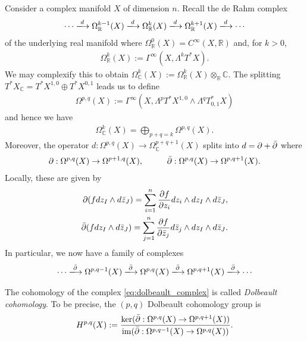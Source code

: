 \documentclass[12pt]{ociamthesis}  %
\begin{document}
Consider a complex manifold $X$ of dimension $n$. Recall the de Rahm
complex
\begin{align*}
  \cdots \xlongrightarrow{d}
  \Omega_{\mathbb{R}}^{k-1}(X)\xlongrightarrow{d}
  \Omega_{\mathbb{R}}^{k}(X)\xlongrightarrow{d}
  \Omega_{\mathbb{R}}^{k+1}(X)\xlongrightarrow{d}
  \cdots
\end{align*}
of the underlying real manifold where
$\Omega^0_{\mathbb{R}}(X) = C^\infty(X,\mathbb{R})$ and,
for $k > 0$,
\begin{align*}
  \Omega^k_{\mathbb{R}}(X) := \Gamma^\infty(X,\Lambda^k T^*X).
\end{align*}
We may complexify this to obtain
$\Omega^k_{\mathbb C}(X) := \Omega^k_{\mathbb R}(X)\otimes_{\mathbb{R}} \mathbb{C}$.
The splitting $T^*X_\mathbb{C} = T^*X^{1,0} \oplus T^*X^{0,1}$
leads us to define
\begin{align*}
  \Omega^{p,q}(X)
  := \Gamma^\infty(X,\Lambda^p T^*X^{1,0} \wedge\Lambda^q T^*_{0,1}X)
\end{align*}
and hence we have
\begin{align*}
  \Omega^k_{\mathbb C}(X) = \bigoplus_{p+q=k} \Omega^{p,q}(X).
\end{align*}
Moreover, the operator $d : \Omega^{p,q}(X) \to \Omega^{p+q+1}_{\mathbb C}(X)$
splits into $d = \partial + {\bar{\partial}}$ where
\begin{align*}
  \partial : \Omega^{p,q}(X) \to \Omega^{p+1,q}(X),\hspace{1cm}
  {\bar{\partial}} : \Omega^{p,q}(X) \to \Omega^{p,q+1}(X).
\end{align*}
Locally, these are given by
\begin{align*}
  \partial (f dz_I \wedge d\bar z_J) = \sum_{i=1}^n \frac{\partial f}{\partial z_i} dz_i\wedge dz_I \wedge d\bar z_J, \\
  {\bar{\partial}} (f dz_I \wedge d\bar z_J) = \sum_{j=1}^n \frac{\partial f}{\partial \bar z_j} d\bar z_j\wedge dz_I \wedge d\bar z_J.
\end{align*}
In particular, we now have a family of complexes
\begin{align}\label{eq:dolbeault_complex}
  \cdots \xlongrightarrow\dol
  \Omega^{p,q-1}(X)\xlongrightarrow\dol
  \Omega^{p,q}(X)\xlongrightarrow\dol
  \Omega^{p,q+1}(X)\xlongrightarrow\dol
  \cdots
\end{align}
\begin{definition}
  The cohomology of the complex \ref{eq:dolbeault_complex} is
  called \emph{Dolbeault cohomology}. To be precise, the
  $(p,q)$ Dolbeault cohomology group is
  \begin{align*}
    H^{p,q}(X) := \frac{
      \ker({\bar{\partial}} : \Omega^{p,q}(X) \to \Omega^{p,q+1}(X))
    }{
      \operatorname{im}({\bar{\partial}} : \Omega^{p,q-1}(X) \to \Omega^{p,q}(X))
    }.
  \end{align*}
\end{definition}
\end{document}

